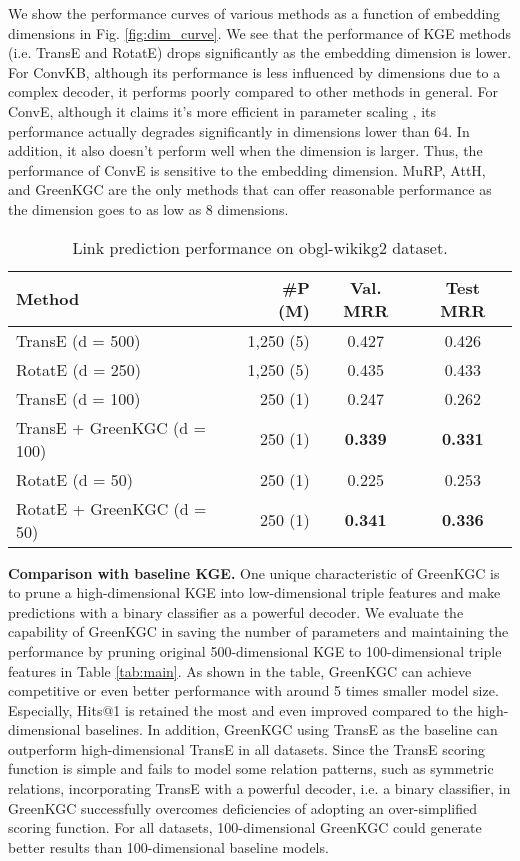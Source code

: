 \documentclass{article}
\begin{document}
We show the performance curves of various methods as a function of
embedding dimensions in Fig. \ref{fig:dim_curve}. We see that the
performance of KGE methods (i.e. TransE and RotatE) drops significantly 
as the embedding dimension is lower. For ConvKB, although its
performance is less influenced by dimensions due to a complex decoder, 
it performs poorly compared to other methods in general. For ConvE, although
it claims it's more efficient in parameter scaling 
\citep{dettmers2018convolutional}, its performance actually degrades 
significantly in dimensions lower than 64. In addition, it also doesn't
perform well when the dimension is larger. Thus, the performance of ConvE is 
sensitive to the embedding dimension. 
MuRP, AttH, and GreenKGC are the only methods that can offer 
reasonable performance as the dimension goes to as low as 8 dimensions. 

\begin{table}[t]
\color{black}
\setlength\tabcolsep{3pt}
\centering
\begin{tabular}{l|r|c|c}
\hline
Method & \#P (M) & Val. MRR & Test MRR  \\
\hline
TransE (d = 500) & 1,250 (5) & 0.427 & 0.426  \\
RotatE (d = 250) & 1,250 (5) & 0.435 & 0.433  \\
\hline
TransE (d = 100) & 250 (1) & 0.247 & 0.262  \\
TransE + GreenKGC (d = 100) & 250 (1) & \textbf{0.339} & \textbf{0.331}  \\\hline
RotatE (d = 50)  & 250 (1) & 0.225 & 0.253  \\
RotatE + GreenKGC (d = 50)  & 250 (1) & \textbf{0.341} & \textbf{0.336} \\
\hline
\end{tabular}
\caption{Link prediction performance on obgl-wikikg2 dataset. }
\label{tab:ogbl}
\end{table}


\textbf{Comparison with baseline KGE.} One unique characteristic of
GreenKGC is to prune a high-dimensional KGE into low-dimensional triple
features and make predictions with a binary classifier as a powerful
decoder. We evaluate the capability of GreenKGC in saving the number of
parameters and maintaining the performance by pruning original 
500-dimensional KGE to 100-dimensional triple features in Table \ref{tab:main}. 
As shown in the table, GreenKGC can achieve competitive or even better 
performance with around 5 times smaller model size. Especially, Hits@1 is 
retained the most and even improved compared to the high-dimensional baselines. 
In addition, GreenKGC using TransE as the baseline can outperform 
high-dimensional TransE in all datasets. Since the 
TransE scoring function is simple and fails to model some relation patterns, such 
as symmetric relations, incorporating TransE with a powerful decoder, i.e. a 
binary classifier, in GreenKGC successfully overcomes deficiencies of adopting 
an over-simplified scoring function. 
For all datasets, 100-dimensional GreenKGC could generate better results than
100-dimensional baseline models.
\end{document}
